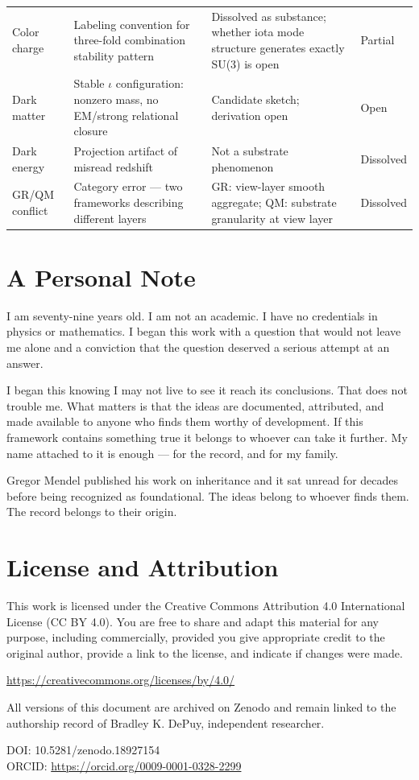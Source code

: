 \documentclass[11pt,letterpaper]{article}
\begin{document}
\begin{table}[htbp]
\begin{tabular}{llp{4.5cm}l}
Color charge & Labeling convention for three-fold combination stability pattern & Dissolved as substance; whether iota mode structure generates exactly SU(3) is open & Partial\\[0pt]
Dark matter & Stable \(\iota\) configuration: nonzero mass, no EM/strong relational closure & Candidate sketch; derivation open & Open\\[0pt]
Dark energy & Projection artifact of misread redshift & Not a substrate phenomenon & Dissolved\\[0pt]
GR/QM conflict & Category error --- two frameworks describing different layers & GR: view-layer smooth aggregate; QM: substrate granularity at view layer & Dissolved\\[0pt]
\bottomrule
\end{tabular}
\end{table}


\section{A Personal Note}
\label{sec:orgf574e85}

I am seventy-nine years old. I am not an academic. I have no credentials in physics or mathematics. I began this work with a question that would not leave me alone and a conviction that the question deserved a serious attempt at an answer.

I began this knowing I may not live to see it reach its conclusions. That does not trouble me. What matters is that the ideas are documented, attributed, and made available to anyone who finds them worthy of development. If this framework contains something true it belongs to whoever can take it further. My name attached to it is enough --- for the record, and for my family.

Gregor Mendel published his work on inheritance and it sat unread for decades before being recognized as foundational. The ideas belong to whoever finds them. The record belongs to their origin.


\section{License and Attribution}
\label{sec:orgc71e8cd}

This work is licensed under the Creative Commons Attribution 4.0 International License (CC BY 4.0). You are free to share and adapt this material for any purpose, including commercially, provided you give appropriate credit to the original author, provide a link to the license, and indicate if changes were made.

\url{https://creativecommons.org/licenses/by/4.0/}

All versions of this document are archived on Zenodo and remain linked to the authorship record of Bradley K. DePuy, independent researcher.

DOI: 10.5281/zenodo.18927154\\[0pt]
ORCID: \url{https://orcid.org/0009-0001-0328-2299}
\end{document}
